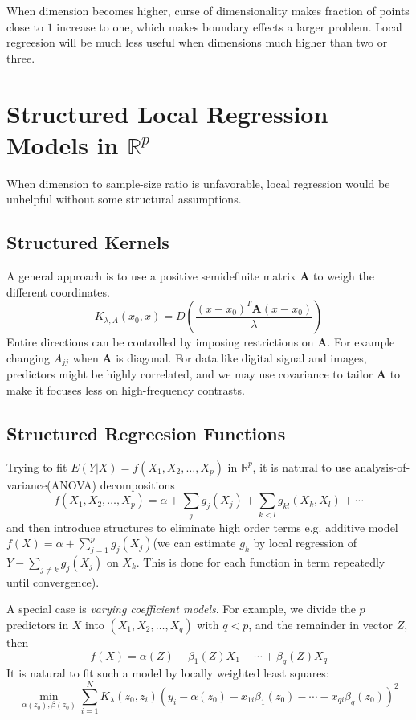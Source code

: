 When dimension becomes higher, curse of dimensionality makes fraction of points close to $1$
increase to one, which makes boundary effects a larger problem. Local regreesion will be much 
less useful when dimensions much higher than two or three. 

\section{Structured Local Regression Models in $\mathbb{R}^p$}
When dimension to sample-size ratio is unfavorable, local regression would be unhelpful without
some structural assumptions. 

\subsection{Structured Kernels}
A general approach is to use a positive semidefinite matrix $\mathbf{A}$ to weigh the different 
coordinates. 
\begin{equation*}
K_{\lambda,A}(x_0,x)=D\left(\frac{(x-x_0)^T\mathbf{A}(x-x_0)}{\lambda}\right)
\end{equation*}
Entire directions can be controlled by imposing restrictions on $\mathbf{A}$. For example
changing $A_{jj}$ when $\mathbf{A}$ is diagonal. 
For data like digital signal and images, predictors might be highly correlated, and we may
use covariance to tailor $\mathbf{A}$ to make it focuses less on  high-frequency contrasts. 

\subsection{Structured Regreesion Functions}
Trying to fit $E(Y|X)=f(X_1,X_2,\ldots,X_p)$ in $\mathbb{R}^p$, it is natural to use 
analysis-of-variance(ANOVA) decompositions
\begin{equation*}
f(X_1,X_2,\ldots,X_p)=\alpha+\sum_jg_j(X_j)+\sum_{k<l}g_{kl}(X_k,X_l)+\cdots
\end{equation*}
and then introduce structures to eliminate high order terms e.g. additive model 
$f(X)=\alpha+\sum_{j=1}^pg_j(X_j)$(we can estimate $g_k$ by local regression of 
$Y-\sum_{j\neq k}g_j(X_j)$ on $X_k$. This is done for each function in term repeatedly until
convergence). 

A special case is \textit{varying coefficient models}. For example, we divide the $p$ predictors
in $X$ into $(X_1,X_2,\ldots,X_q)$ with $q<p$, and the remainder in vector $Z$, then
\begin{equation*}
f(X)=\alpha(Z)+\beta_1(Z)X_1+\cdots+\beta_q(Z)X_q
\end{equation*}
It is natural to fit such a model by locally weighted least squares: 
\begin{equation*}
\min_{\alpha(z_0),\beta(z_0)}\sum_{i=1}^NK_{\lambda}(z_0,z_i)(y_i-\alpha(z_0)-x_{1i}\beta_1(z_0)
-\cdots-x_{qi}\beta_q(z_0))^2
\end{equation*}

